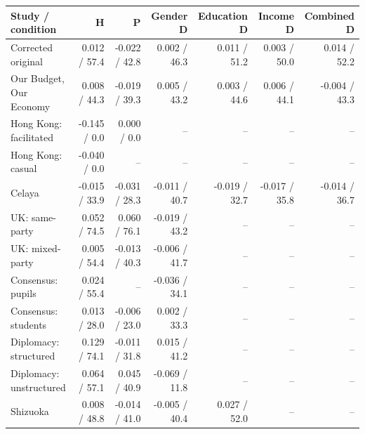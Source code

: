 
\begin{tabular}{lrrrrrr}
\toprule
Study / condition & H & P & Gender D & Education D & Income D & Combined D\\
\midrule
Corrected original & 0.012 / 57.4 & -0.022 / 42.8 & 0.002 / 46.3 & 0.011 / 51.2 & 0.003 / 50.0 & 0.014 / 52.2\\
Our Budget, Our Economy & 0.008 / 44.3 & -0.019 / 39.3 & 0.005 / 43.2 & 0.003 / 44.6 & 0.006 / 44.1 & -0.004 / 43.3\\
Hong Kong: facilitated & -0.145 / 0.0 & 0.000 / 0.0 & -- & -- & -- & --\\
Hong Kong: casual & -0.040 / 0.0 & -- & -- & -- & -- & --\\
Celaya & -0.015 / 33.9 & -0.031 / 28.3 & -0.011 / 40.7 & -0.019 / 32.7 & -0.017 / 35.8 & -0.014 / 36.7\\
\addlinespace
UK: same-party & 0.052 / 74.5 & 0.060 / 76.1 & -0.019 / 43.2 & -- & -- & --\\
UK: mixed-party & 0.005 / 54.4 & -0.013 / 40.3 & -0.006 / 41.7 & -- & -- & --\\
Consensus: pupils & 0.024 / 55.4 & -- & -0.036 / 34.1 & -- & -- & --\\
Consensus: students & 0.013 / 28.0 & -0.006 / 23.0 & 0.002 / 33.3 & -- & -- & --\\
Diplomacy: structured & 0.129 / 74.1 & -0.011 / 31.8 & 0.015 / 41.2 & -- & -- & --\\
\addlinespace
Diplomacy: unstructured & 0.064 / 57.1 & 0.045 / 40.9 & -0.069 / 11.8 & -- & -- & --\\
Shizuoka & 0.008 / 48.8 & -0.014 / 41.0 & -0.005 / 40.4 & 0.027 / 52.0 & -- & --\\
\bottomrule
\end{tabular}
